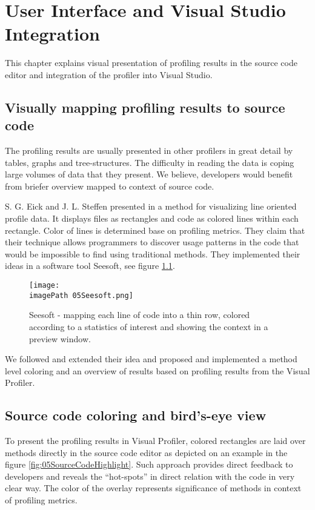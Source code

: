 \chapter{User Interface and Visual Studio Integration }
\label{chap:VPUIandSI}


This chapter explains visual presentation of profiling results in the source code editor and integration of the profiler into Visual Studio.

\section{Visually mapping profiling results to source code}
The profiling results are usually presented in other profilers in great detail by tables, graphs and tree-structures. The difficulty in reading the data is coping large volumes of data that they present. We believe, developers would benefit from briefer overview mapped to context of source code.

S. G. Eick and J. L. Steffen presented in \cite{EickSteffen92} a method for visualizing line oriented profile data. It displays files as rectangles and code as colored lines within each rectangle. Color of lines is determined base on profiling metrics. They claim that their technique allows programmers to discover usage patterns in the code that would be impossible to find using traditional methods. They implemented their ideas in a software tool Seesoft, see figure \ref{fig:05SeeSoft}.

\begin{figure}
	\centering
		\texttt{[image: \\imagePath 05Seesoft.png]}
		\caption{Seesoft - mapping each line of code into a thin row, colored according to a statistics of interest and showing the context in a preview window.}
	\label{fig:05SeeSoft}
\end{figure}


We followed and extended their idea and proposed and implemented a method level coloring and an overview of results based on profiling results from the Visual Profiler. 

\section{Source code coloring and bird's-eye view}
To present the profiling results in Visual Profiler, colored rectangles are laid over methods directly in the source code editor as depicted on an example in the figure \ref{fig:05SourceCodeHighlight}. Such approach provides direct feedback to developers and reveals the ``hot-spots'' in direct relation with the code in very clear way.  The color of the overlay represents significance of methods in context of profiling metrics.

